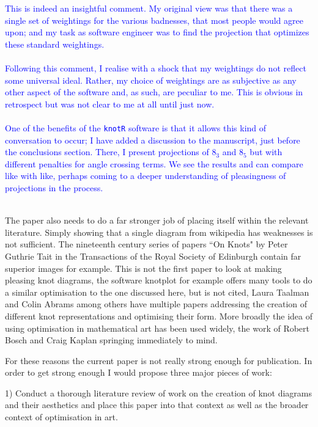 \documentclass[12pt]{article}
\begin{document}
\textcolor{blue}{This is indeed an insightful comment.  My original
  view was that there was a single set of weightings for the various
  badnesses, that most people would agree upon; and my task as
  software engineer was to find the projection that optimizes these
  standard weightings.\\ \\ Following this comment, I realise with a
  shock that my weightings do not reflect some universal ideal.
  Rather, my choice of weightings are as subjective as any other
  aspect of the software and, as such, are peculiar to me.  This is
  obvious in retrospect but was not clear to me at all until just
  now.\\ \\ One of the benefits of the {\tt knotR} software is that it
  allows this kind of conversation to occur; I have added a discussion
  to the manuscript, just before the conclusions section.  There, I
  present projections of $8_3$ and $8_5$ but with different penalties
  for angle crossing terms.  We see the results and can compare like
  with like, perhaps coming to a deeper understanding of pleasingness
  of projections in the process.\\ \\}

The paper also needs to do a far stronger job of placing itself within
the relevant literature. Simply showing that a single diagram from
wikipedia has weaknesses is not sufficient. The nineteenth century
series of papers ``On Knots" by Peter Guthrie Tait in the Transactions
of the Royal Society of Edinburgh contain far superior images for
example. This is not the first paper to look at making pleasing knot
diagrams, the software knotplot for example offers many tools to do a
similar optimisation to the one discussed here, but is not cited,
Laura Taalman and Colin Abrams among others have multiple papers
addressing the creation of different knot representations and
optimising their form. More broadly the idea of using optimisation in
mathematical art has been used widely, the work of Robert Bosch and
Craig Kaplan springing immediately to mind.

For these reasons the current paper is not really strong enough for
publication. In order to get strong enough I would propose three major
pieces of work:

1) Conduct a thorough literature review of work on the creation of
knot diagrams and their aesthetics and place this paper into that
context as well as the broader context of optimisation in art.
\end{document}

